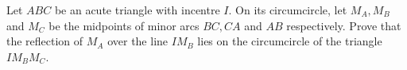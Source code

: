 Let $ABC$ be an acute triangle with incentre $I$.
On its circumcircle, let $M_A,M_B$ and $M_C$ be the midpoints of minor arcs $BC,CA$ and $AB$ respectively.
Prove that the reflection of $M_A$ over the line $IM_B$ lies on the circumcircle of the triangle $IM_BM_C$.
